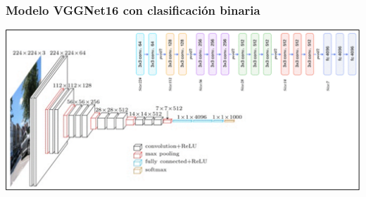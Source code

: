 \documentclass[12pt,twoside,titlepage]{ingenius}
\newenvironment{figura}
  {\par\bigskip\noindent\minipage{\linewidth}}
  {\endminipage\par\bigskip}
\begin{document}
\begin{multicols}{2}
\subsubsection{Modelo VGGNet16 con clasificación binaria}
\begin{figura}%
	\centering
	\includegraphics[scale=0.25]{figuras/fig7.png}
	\label{figura7}
\end{figura}



\end{multicols}
\end{document}
